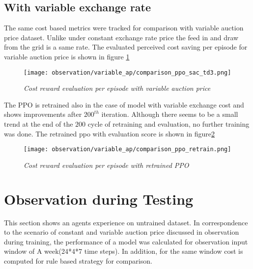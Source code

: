 \begin{large}
\subsection*{With variable exchange rate}

The same cost based metrics were tracked for comparison with variable auction price dataset. Unlike under constant exchange rate price the feed in and draw from the grid is a same rate. The evaluated perceived cost saving per episode for variable auction price is shown in figure \ref{fig:cost_compare_variable_ap} \\ 


\begin{figure}[h]
	\begin{center}
		\texttt{[image: observation/variable\_ap/comparison\_ppo\_sac\_td3.png]}
		\caption{ \textit{Cost reward evaluation per episode with variable auction price} }
		\label{fig:cost_compare_variable_ap}
	\end{center}
\end{figure}

The PPO is retrained also in the case of model with variable exchange cost and shows improvements after $200^{th}$ iteration. Although there seems to be a small trend at the end of the $200$ cycle of retraining and evaluation, no further training was done. The retrained ppo with evaluation score is shown in figure\ref{fig:cost_compare_ap_ppo_retrain} \\

\begin{figure}[h]
	\begin{center}
		\texttt{[image: observation/variable\_ap/comparison\_ppo\_retrain.png]}
		\caption{ \textit{Cost reward evaluation per episode with retrained PPO} }
		\label{fig:cost_compare_ap_ppo_retrain}
	\end{center}
\end{figure}

\section{Observation during Testing}

This section shows an agents experience on untrained dataset. In correspondence to the scenario of constant and variable auction price discussed in observation during training, the performance of a model was calculated for observation input window of A week(24*4*7 time steps). In addition, for the same window cost is computed for rule based strategy for comparison. \\


\end{large}
